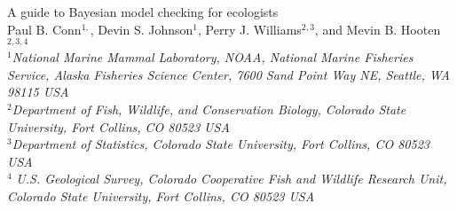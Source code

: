 \documentclass[12pt,english]{article}
\begin{document}
\begin{spacing}{1.9}


\begin{center}
  A guide to Bayesian model checking for ecologists
  \bigskip\\
  \normalsize {\sc Paul B. Conn$^{1,}$\footnotemark[5], Devin S. Johnson$^1$, Perry J. Williams$^{2,3}$, and Mevin
    B. Hooten$^{2,3,4}$
     }\smallskip\\
  $^1${\em National Marine Mammal Laboratory, NOAA, National Marine
    Fisheries Service, Alaska Fisheries Science Center, 7600 Sand
    Point Way NE, Seattle, WA 98115 USA }\\ \medskip $^2${\em Department of Fish, Wildlife, and
    Conservation Biology, Colorado State University, Fort Collins, CO
    80523 USA } \\ \medskip  $^3${\em Department of Statistics, Colorado
    State University, Fort Collins, CO 80523 USA }\\ \medskip $^4${\em
    U.S. Geological Survey, Colorado Cooperative Fish and Wildlife
    Research Unit, Colorado State University, Fort Collins, CO 80523
    USA }\\ \medskip
\end{center}


\raggedright \setlength{\parindent}{0.3in}
{}

\linenumbers


\end{spacing}
\end{document}
